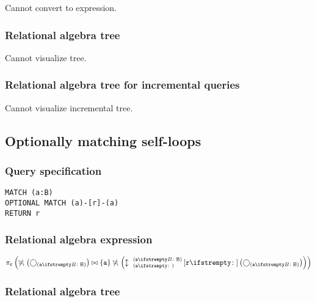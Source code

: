 Cannot convert to expression.

\subsubsection*{Relational algebra tree}

Cannot visualize tree.

\subsubsection*{Relational algebra tree for incremental queries}

Cannot visualize incremental tree.

\subsection{Optionally matching self-loops}

\subsubsection*{Query specification}

\begin{lstlisting}
MATCH (a:B)
OPTIONAL MATCH (a)-[r]-(a)
RETURN r
\end{lstlisting}

\subsubsection*{Relational algebra expression}

$\projection{\var{r}} \left(\alldifferent{} \left(\getvertices{a}{B}\right) \join \{\var{a}\} \alldifferent{} \left(\expandboth{a}{a}{B}{r}{} \left(\getvertices{a}{B}\right)\right)\right)$

\subsubsection*{Relational algebra tree}


